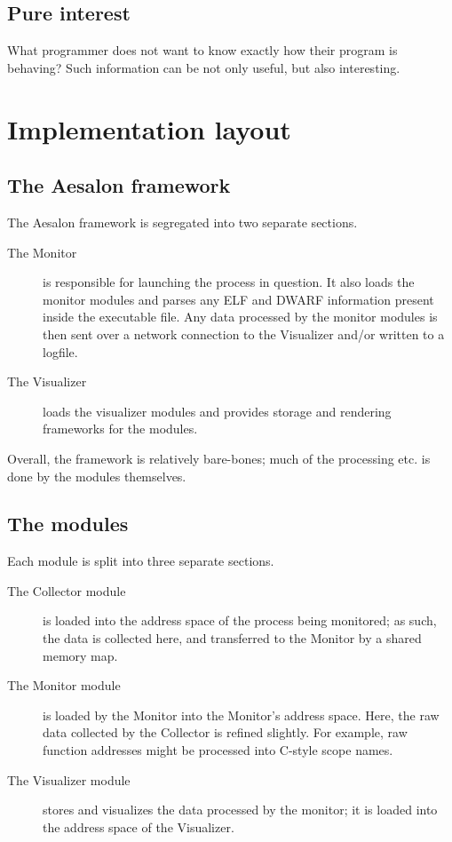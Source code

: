 \documentclass[a4paper,10pt]{report}
\begin{document}
\subsection{Pure interest}
What programmer does not want to know exactly how their program is behaving? Such information can be
not only useful, but also interesting.

\section{Implementation layout}
\subsection{The Aesalon framework}
The Aesalon framework is segregated into two separate sections.
\flushleft
\begin{description}
 \item[\textnormal{The} Monitor] is responsible for launching the process in question. It also loads the monitor modules
  and parses any ELF and DWARF information present inside the executable file. Any data processed by the
  monitor modules is then sent over a network connection to the Visualizer and/or written to a logfile.
 \item[\textnormal{The} Visualizer] loads the visualizer modules and provides storage and rendering frameworks for the
  modules.
\end{description}

Overall, the framework is relatively bare-bones; much of the processing etc. is done by the modules themselves.

\subsection{The modules}
Each module is split into three separate sections.
\flushleft
\begin{description}
 \item[\textnormal{The} Collector module] is loaded into the address space of the process being monitored; as such, the
  data is collected here, and transferred to the Monitor by a shared memory map.
 \item[\textnormal{The} Monitor module] is loaded by the Monitor into the Monitor's address space. Here, the raw data collected
  by the Collector is refined slightly. For example, raw function addresses might be processed into C-style
  scope names.
 \item[\textnormal{The} Visualizer module] stores and visualizes the data processed by the monitor; it is loaded into the address
  space of the Visualizer.
\end{description}
\end{document}
